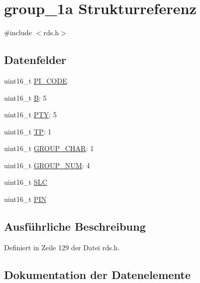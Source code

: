 \hypertarget{structgroup__1a}{}\section{group\+\_\+1a Strukturreferenz}
\label{structgroup__1a}


{\ttfamily \#include $<$rds.\+h$>$}

\subsection*{Datenfelder}
\begin{DoxyCompactItemize}
\item 
uint16\+\_\+t \hyperlink{structgroup__1a_a5cd9b1f6413028425796c1129aa8fd87}{P\+I\+\_\+\+C\+O\+D\+E}
\item 
uint16\+\_\+t \hyperlink{structgroup__1a_ae783bd90764c8455228772c025c064e4}{B}\+: 5
\item 
uint16\+\_\+t \hyperlink{structgroup__1a_a0474967478fbbc2c71b800d2e0132d45}{P\+T\+Y}\+: 5
\item 
uint16\+\_\+t \hyperlink{structgroup__1a_ab9e634c63b0d95a96716d5f6d7f06d72}{T\+P}\+: 1
\item 
uint16\+\_\+t \hyperlink{structgroup__1a_a66d4119990dc4c3e040a43885e9bb953}{G\+R\+O\+U\+P\+\_\+\+C\+H\+A\+R}\+: 1
\item 
uint16\+\_\+t \hyperlink{structgroup__1a_a9f692e9f76ee88348d426bcd4e9bc70b}{G\+R\+O\+U\+P\+\_\+\+N\+U\+M}\+: 4
\item 
uint16\+\_\+t \hyperlink{structgroup__1a_adeb94d897f554bdd08433c17155c53d2}{S\+L\+C}
\item 
uint16\+\_\+t \hyperlink{structgroup__1a_a23b9db30b873d9b45f435df66328a784}{P\+I\+N}
\end{DoxyCompactItemize}


\subsection{Ausführliche Beschreibung}


Definiert in Zeile 129 der Datei rds.\+h.



\subsection{Dokumentation der Datenelemente}
\hypertarget{structgroup__1a_ae783bd90764c8455228772c025c064e4}{}
